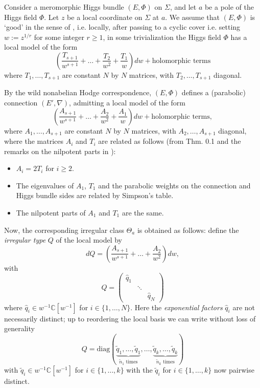 \documentclass[11pt,a4paper]{amsart}
\numberwithin{equation}{section}
\begin{document}
Consider a meromorphic Higgs bundle $(E, \Phi)$ on $\Sigma$, and let $a$ be a pole of the Higgs field $\Phi$. Let $z$ be a local coordinate on $\Sigma$ at $a$. We assume that $(E, \Phi)$ is `good' in the sense of \cite[Remark 6]{boalch2018wild}, i.e. locally, after passing to a cyclic cover i.e. setting $w:=z^{1/r}$ for some integer $r\geq 1$, in some trivialization the Higgs field $\Phi$ has a local model of the form
\begin{equation}
\label{eq:local_model_Higgs_bundle}
\left(\frac{T_{s+1}}{w^{s+1}}+\dots +\frac{T_2}{w^2}+\frac{T_1}{w}\right)dw+ \text{holomorphic terms}
\end{equation}
where $T_1, \dots, T_{s+1}$ are constant $N$ by $N$ matrices, with $T_2, \dots, T_{s+1}$ diagonal. 

By the wild nonabelian Hodge correspondence, $(E,\Phi)$ defines a (parabolic) connection $(E', \nabla)$, admitting a local model of the form
\begin{equation}
\label{eq:local_model_connection}
\left(\frac{A_{s+1}}{w^{s+1}}+\dots +\frac{A_2}{w^2}+\frac{A_1}{w}\right)dw + \text{holomorphic terms},
\end{equation}
where $A_1, \dots, A_{s+1}$ are constant $N$ by $N$ matrices, with $A_2, \dots, A_{s+1}$ diagonal,
where the matrices $A_i$ and $T_i$ are related as follows (from Thm. 0.1 and the remarks on the nilpotent parts in \cite{biquard2004wild}):
\begin{itemize}
\item $A_i=2 T_i$ for $i\geq 2$. 
\item The eigenvalues of $A_1$, $T_1$ and the parabolic weights on the connection and Higgs bundle sides are related by Simpson's table.
\item The nilpotent parts of $A_1$ and $T_1$ are the same.
\end{itemize}
Now, the corresponding irregular class $\Theta_a$ is obtained as follows: define the \emph{irregular type} $Q$ of the local model by 
\begin{equation}
\label{eq:def_irreguar_type}
dQ=\left(\frac{A_{s+1}}{w^{s+1}}+\dots +\frac{A_2}{w^2}\right)dw,
\end{equation}
with
\[
Q=\begin{pmatrix}
\widehat{q}_1 & & \\
& \ddots &\\
& & \widehat{q}_N
\end{pmatrix}
\]
where $\widehat q_i\in w^{-1}\mathbb C[w^{-1}]$ for $i\in \{1, \dots, N\}$. Here the \emph{exponential factors} $\widehat q_i$ are not necessarily distinct; up to reordering the local basis we can write without loss of generality
\[
Q=\mathrm{diag}(\underbrace{\widetilde q_1, \dots, \widetilde q_1}_{\widetilde n_1 \text{ times}}, \dots, \underbrace{\widetilde q_k, \dots, \widetilde q_k}_{\widetilde n_k \text{ times}})
\]
with $\widetilde q_i\in w^{-1}\mathbb C[w^{-1}]$ for $i\in \{1, \dots, k\}$
with the $\widetilde q_i$ for $i\in \{1, \dots, k\}$ now pairwise distinct. 
\end{document}
